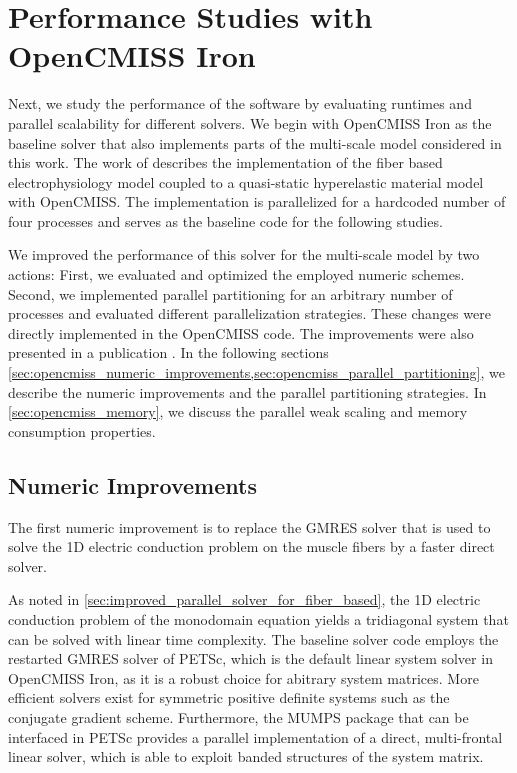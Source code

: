 
\iffalse
\section{Performance Studies with OpenCMISS Iron}

Next, we study the performance of the software by evaluating runtimes and parallel scalability for different solvers.
We begin with OpenCMISS Iron as the baseline solver that also implements parts of the multi-scale model considered in this work. The work of \cite{Heidlauf2013} describes the implementation of the fiber based electrophysiology model coupled to a quasi-static hyperelastic material model with OpenCMISS. The implementation is parallelized for a hardcoded number of four processes and serves as the baseline code for the following studies.

We improved the performance of this solver for the multi-scale model by two actions: First, we evaluated and optimized the employed numeric schemes. Second, we implemented parallel partitioning for an arbitrary number of processes and evaluated different parallelization strategies.
These changes were directly implemented in the OpenCMISS code. The improvements were also presented in a publication \cite{Bradley:2018:EDB}. In the following sections \cref{sec:opencmiss_numeric_improvements,sec:opencmiss_parallel_partitioning}, we describe the numeric improvements and the parallel partitioning strategies. In \cref{sec:opencmiss_memory}, we discuss the parallel weak scaling and memory consumption properties.

\subsection{Numeric Improvements}\label{sec:opencmiss_numeric_improvements}

The first numeric improvement is to replace the GMRES solver that is used to solve the 1D electric conduction problem on the muscle fibers
by a faster direct solver. 

As noted in \cref{sec:improved_parallel_solver_for_fiber_based}, the 1D electric conduction problem of the monodomain equation yields a tridiagonal system that can be solved with linear time complexity. The baseline solver code employs the restarted GMRES solver of PETSc, which is the default linear system solver in OpenCMISS Iron, as it is a robust choice for abitrary system matrices. 
More efficient solvers exist for symmetric positive definite systems such as the conjugate gradient scheme. 
Furthermore, the MUMPS package \cite{mumps2001} that can be interfaced in PETSc provides a parallel implementation of a direct, multi-frontal linear solver, which is able to exploit banded structures of the system matrix.

